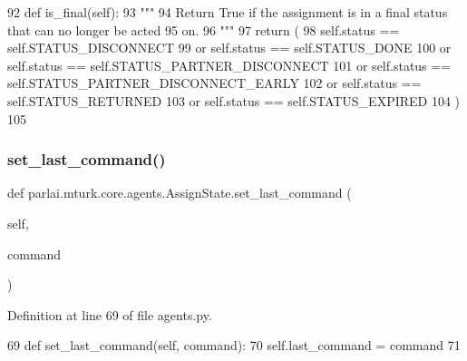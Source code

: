 \begin{DoxyCode}
92     \textcolor{keyword}{def }is\_final(self):
93         \textcolor{stringliteral}{"""}
94 \textcolor{stringliteral}{        Return True if the assignment is in a final status that can no longer be acted}
95 \textcolor{stringliteral}{        on.}
96 \textcolor{stringliteral}{        """}
97         \textcolor{keywordflow}{return} (
98             self.status == self.STATUS\_DISCONNECT
99             \textcolor{keywordflow}{or} self.status == self.STATUS\_DONE
100             \textcolor{keywordflow}{or} self.status == self.STATUS\_PARTNER\_DISCONNECT
101             \textcolor{keywordflow}{or} self.status == self.STATUS\_PARTNER\_DISCONNECT\_EARLY
102             \textcolor{keywordflow}{or} self.status == self.STATUS\_RETURNED
103             \textcolor{keywordflow}{or} self.status == self.STATUS\_EXPIRED
104         )
105 
\end{DoxyCode}
\mbox{\label{classparlai_1_1mturk_1_1core_1_1agents_1_1AssignState_a6251191f5a8d16778dc56e21564ede79}} 
\subsubsection{\texorpdfstring{set\+\_\+last\+\_\+command()}{set\_last\_command()}}
{\footnotesize\ttfamily def parlai.\+mturk.\+core.\+agents.\+Assign\+State.\+set\+\_\+last\+\_\+command (\begin{DoxyParamCaption}\item[{}]{self,  }\item[{}]{command }\end{DoxyParamCaption})}



Definition at line 69 of file agents.\+py.


\begin{DoxyCode}
69     \textcolor{keyword}{def }set\_last\_command(self, command):
70         self.last\_command = command
71 
\end{DoxyCode}
\mbox{\label{classparlai_1_1mturk_1_1core_1_1agents_1_1AssignState_a7cd23ff37c1c1e0c6d8548f77a8d078c}} 
